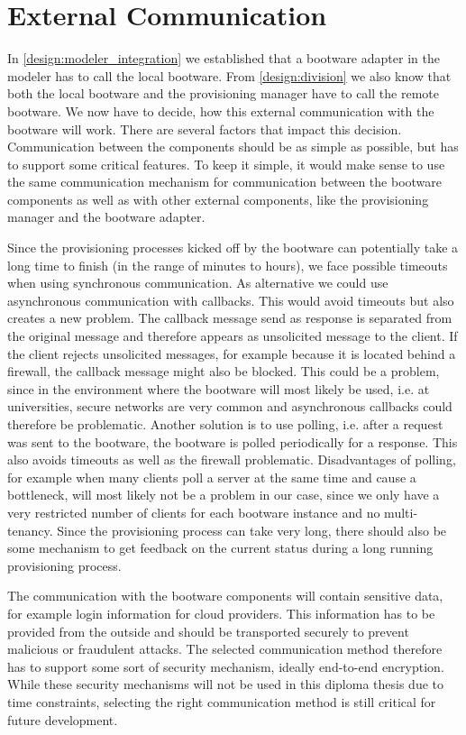\section{External Communication}
\label{design:communication}

In \autoref{design:modeler_integration} we established that a bootware adapter in the modeler has to call the local bootware.
From \autoref{design:division} we also know that both the local bootware and the provisioning manager have to call the remote bootware.
We now have to decide, how this external communication with the bootware will work.
There are several factors that impact this decision.
Communication between the components should be as simple as possible, but has to support some critical features.
To keep it simple, it would make sense to use the same communication mechanism for communication between the bootware components as well as with other external components, like the provisioning manager and the bootware adapter.

Since the provisioning processes kicked off by the bootware can potentially take a long time to finish (in the range of minutes to hours), we face possible timeouts when using synchronous communication.
As alternative we could use asynchronous communication with callbacks.
This would avoid timeouts but also creates a new problem.
The callback message send as response is separated from the original message and therefore appears as unsolicited message to the client.
If the client rejects unsolicited messages, for example because it is located behind a firewall, the callback message might also be blocked.
This could be a problem, since in the environment where the bootware will most likely be used, i.e. at universities, secure networks are very common and asynchronous callbacks could therefore be problematic.
Another solution is to use polling, i.e. after a request was sent to the bootware, the bootware is polled periodically for a response.
This also avoids timeouts as well as the firewall problematic.
Disadvantages of polling, for example when many clients poll a server at the same time and cause a bottleneck, will most likely not be a problem in our case, since we only have a very restricted number of clients for each bootware instance and no multi-tenancy.
Since the provisioning process can take very long, there should also be some mechanism to get feedback on the current status during a long running provisioning process.

The communication with the bootware components will contain sensitive data, for example login information for cloud providers.
This information has to be provided from the outside and should be transported securely to prevent malicious or fraudulent attacks.
The selected communication method therefore has to support some sort of security mechanism, ideally end-to-end encryption.
While these security mechanisms will not be used in this diploma thesis due to time constraints, selecting the right communication method is still critical for future development.


